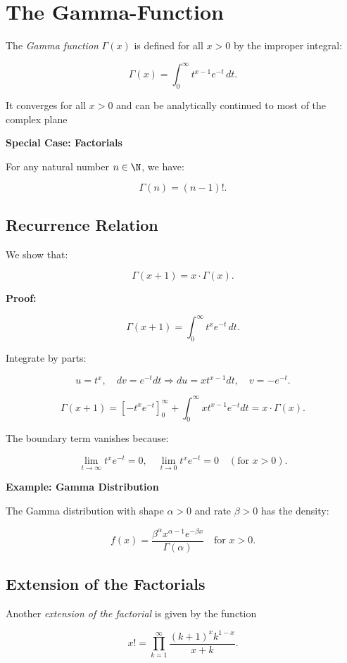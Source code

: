 \chapter{The Gamma-Function}

The \emph{Gamma function} \( \Gamma(x) \) is defined for all \( x > 0 \) by the improper integral:

\[
    \Gamma(x) = \int_0^\infty t^{x-1} e^{-t} \,dt.
\]

It converges for all \( x > 0 \) and can be analytically continued to most of the complex plane 

\textbf{Special Case: Factorials}

For any natural number \( n \in \N \), we have:

\[
    \Gamma(n) = (n - 1)!.
\]

\section{Recurrence Relation}

We show that:

\[
    \Gamma(x + 1) = x \cdot \Gamma(x).
\]

\textbf{Proof:}

\[
    \Gamma(x + 1) = \int_0^\infty t^x e^{-t} \,dt.
\]

Integrate by parts:

\[
    u = t^x, \quad dv = e^{-t} dt \Rightarrow du = x t^{x-1} dt, \quad v = -e^{-t}.
\]

\[
    \Gamma(x + 1) = {\left[ -t^x e^{-t} \right]}_{0}^{\infty} + \int_0^\infty x t^{x-1} e^{-t} dt = x \cdot \Gamma(x).
\]

The boundary term vanishes because:

\[
    \lim_{t \to \infty} t^x e^{-t} = 0, \quad \lim_{t \to 0} t^x e^{-t} = 0 \quad (\text{for } x > 0).
\]

\textbf{Example: Gamma Distribution}

The Gamma distribution with shape \( \alpha > 0 \) and rate \( \beta > 0 \) has the density:

\[
    f(x) = \frac{\beta^\alpha x^{\alpha - 1} e^{-\beta x}}{\Gamma(\alpha)} \quad \text{for } x > 0.
\]

\section{Extension of the Factorials}

Another \emph{extension of the factorial} is given by the function 

\[
    x! = \prod_{k = 1}^{\infty} \frac{(k + 1)^x k^{1 - x}}{x + k}.
\]


